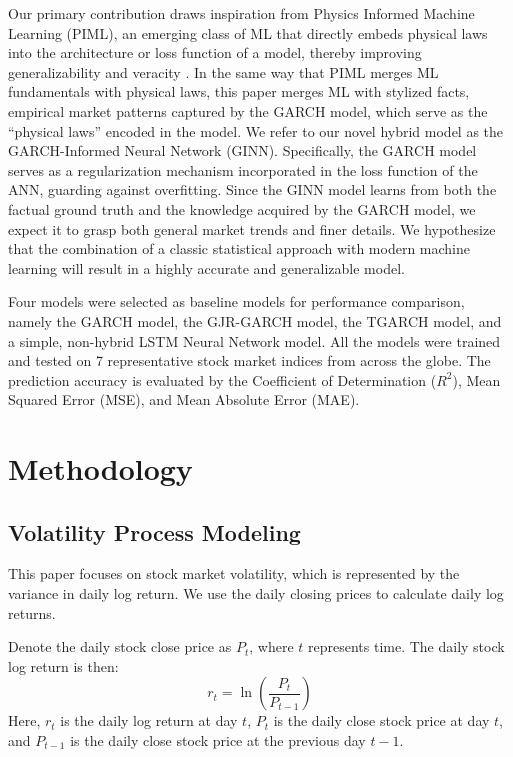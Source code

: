 Our primary contribution draws inspiration from Physics Informed Machine Learning (PIML), an emerging class of ML that directly embeds physical laws into the architecture or loss function of a model, thereby improving generalizability and veracity \cite{raissi_physics-informed_2019, karniadakis_physics-informed_2021, chen_accelerating_2023}. In the same way that PIML merges ML fundamentals with physical laws, this paper merges ML with stylized facts, empirical market patterns captured by the GARCH model, which serve as the “physical laws” encoded in the model. We refer to our novel hybrid model as the  GARCH-Informed Neural Network (GINN). Specifically, the GARCH model serves as a regularization mechanism incorporated in the loss function of the ANN, guarding against overfitting. Since the GINN model learns from both the factual ground truth and the knowledge acquired by the GARCH model, we expect it to grasp both general market trends and finer details.  We hypothesize that the combination of a classic statistical approach with modern machine learning will result in a highly accurate and generalizable model. 

Four models were selected as baseline models for performance comparison, namely the GARCH model, the GJR-GARCH model, the TGARCH model, and a simple, non-hybrid LSTM Neural Network model. All the models were trained and tested on 7 representative stock market indices from across the globe. The prediction accuracy is evaluated by the Coefficient of Determination ($R^2$), Mean Squared Error (MSE), and Mean Absolute Error (MAE).  

\section{Methodology}
\subsection{Volatility Process Modeling}
This paper focuses on stock market volatility, which is represented by the variance in daily log return. We use the daily closing prices to calculate daily log returns. 

Denote the daily stock close price as $P_t$, where $t$ represents time. The daily stock log return is then:
\begin{equation}
  r_t = \ln{\left( \frac{ P_t }{ P_{t-1} } \right)}
\end{equation}
Here, $r_t$ is the daily log return at day $t$, $P_t$ is the daily close stock price at day $t$, and $P_{t-1}$ is the daily close stock price at the previous day $t-1$. 

